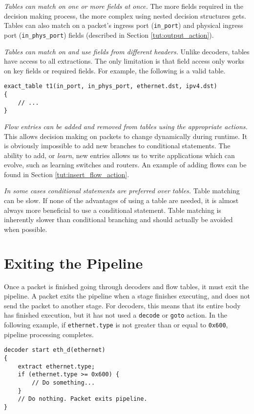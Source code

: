 \textit{Tables can match on one or more fields at once.} The more fields
required in the decision making process, the more complex using nested decision
structures gets. Tables can also match on a packet's ingress port
(\texttt{in\_port}) and physical ingress port (\texttt{in\_phys\_port}) fields
(described in Section \ref{tut:output_action}).

\textit{Tables can match on and use fields from different headers.} Unlike
decoders, tables have access to all extractions. The only limitation is that
field access only works on key fields or required fields. For example, the
following is a valid table.

\begin{lstlisting}
exact_table t1(in_port, in_phys_port, ethernet.dst, ipv4.dst)
{
	// ...
}
\end{lstlisting}

\textit{Flow entries can be added and removed from tables using the appropriate
actions.} This allows decision making on packets to change dynamically during
runtime. It is obviously impossible to add new branches to conditional
statements. The ability to add, or \textit{learn}, new entries allows us to
write applications which can evolve, such as learning switches and routers. An
example of adding flows can be found in Section \ref{tut:insert_flow_action}.

\textit{In some cases conditional statements are preferred over tables.} Table matching can be slow. If none of the advantages of using a table are needed, it is almost always more beneficial to use a conditional statement. Table matching is inherently slower than conditional branching and should actually be avoided when possible.

\section{Exiting the Pipeline} \label{tut:pipeline_exit}

Once a packet is finished going through decoders and flow tables, it must exit the pipeline.
A packet exits the pipeline when
a stage finishes executing, and does not send the packet to another stage. For
decoders, this means that its entire body has finished execution, but it has not
used a \texttt{decode} or \texttt{goto} action. In the following example, if
\texttt{ethernet.type} is not greater than or equal to \texttt{0x600}, pipeline
processing completes.

\begin{codepage}
\begin{lstlisting}
decoder start eth_d(ethernet)
{
	extract ethernet.type;
	if (ethernet.type >= 0x600) {
		// Do something...
	}
	// Do nothing. Packet exits pipeline.
}
\end{lstlisting}
\end{codepage}

